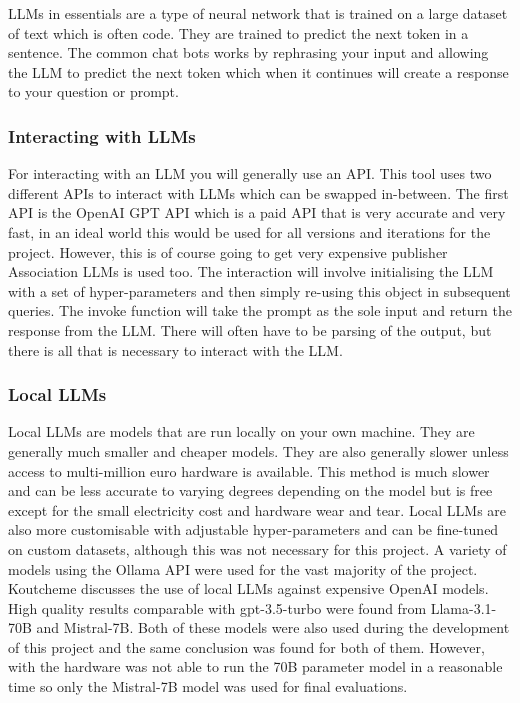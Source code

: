 \documentclass[12pt]{extarticle}
\begin{document}
LLMs in essentials are a type of neural network that is trained on a large dataset of text which is often code. They are trained to predict the next token in a sentence. The common chat bots works by rephrasing your input and allowing the LLM to predict the next token which when it continues will create a response to your question or prompt.

\subsubsection{Interacting with LLMs}

For interacting with an LLM you will generally use an API. This tool uses two different APIs to interact with LLMs which can be swapped in-between. The first API is the OpenAI GPT API which is a paid API that is very accurate and very fast, in an ideal world this would be used for all versions and iterations for the project. However, this is of course going to get very expensive 
publisher Association  LLMs is used too. The interaction will involve initialising the LLM with a set of hyper-parameters and then simply re-using this object in subsequent queries. The invoke function will take the prompt as the sole input and return the response from the LLM. There will often have to be parsing of the output, but there is all that is necessary to interact with the LLM.

\subsubsection{Local LLMs}

Local LLMs are models that are run locally on your own machine. They are generally much smaller and cheaper models. They are also generally slower unless access to multi-million euro hardware is available. This method is much slower and can be less accurate to varying degrees depending on the model but is free except for the small electricity cost and hardware wear and tear. Local LLMs are also more customisable with adjustable hyper-parameters and can be fine-tuned on custom datasets, although this was not necessary for this project. A variety of models using the Ollama API were used for the vast majority of the project. Koutcheme \cite{Koutcheme2025} discusses the use of local LLMs against expensive OpenAI models. High quality results comparable with gpt-3.5-turbo were found from Llama-3.1-70B and Mistral-7B. Both of these models were also used during the development of this project and the same conclusion was found for both of them. However, with the hardware was not able to run the 70B parameter model in a reasonable time so only the Mistral-7B model was used for final evaluations.
\end{document}
